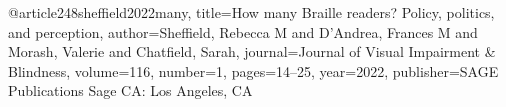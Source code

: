 @article{248sheffield2022many,
title={How many Braille readers? Policy, politics, and perception},
author={Sheffield, Rebecca M and D'Andrea, Frances M and Morash, Valerie and Chatfield, Sarah},
journal={Journal of Visual Impairment \& Blindness},
volume={116},
number={1},
pages={14--25},
year={2022},
publisher={SAGE Publications Sage CA: Los Angeles, CA}
}